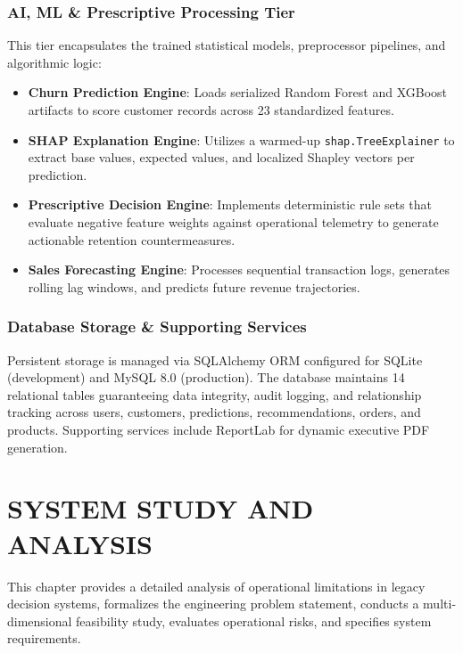 \documentclass[12pt,a4paper]{article}
\begin{document}
\subsubsection{AI, ML \& Prescriptive Processing Tier}
This tier encapsulates the trained statistical models, preprocessor pipelines, and algorithmic logic:
\begin{itemize}[leftmargin=20pt]
    \item \textbf{Churn Prediction Engine}: Loads serialized Random Forest and XGBoost artifacts to score customer records across 23 standardized features.
    \item \textbf{SHAP Explanation Engine}: Utilizes a warmed-up \texttt{shap.TreeExplainer} to extract base values, expected values, and localized Shapley vectors per prediction.
    \item \textbf{Prescriptive Decision Engine}: Implements deterministic rule sets that evaluate negative feature weights against operational telemetry to generate actionable retention countermeasures.
    \item \textbf{Sales Forecasting Engine}: Processes sequential transaction logs, generates rolling lag windows, and predicts future revenue trajectories.
\end{itemize}

\subsubsection{Database Storage \& Supporting Services}
Persistent storage is managed via SQLAlchemy ORM configured for SQLite (development) and MySQL 8.0 (production). The database maintains 14 relational tables guaranteeing data integrity, audit logging, and relationship tracking across users, customers, predictions, recommendations, orders, and products. Supporting services include ReportLab for dynamic executive PDF generation.

\newpage

\section{SYSTEM STUDY AND ANALYSIS}\label{chap:2}

This chapter provides a detailed analysis of operational limitations in legacy decision systems, formalizes the engineering problem statement, conducts a multi-dimensional feasibility study, evaluates operational risks, and specifies system requirements.
\end{document}
